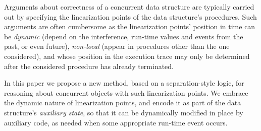 



Arguments about correctness of a concurrent data structure are
typically carried out by specifying the linearization points of the
data structure's procedures.
%
Such arguments are often cumbersome as the linearization points'
position in time can be \emph{dynamic} (depend on the interference,
run-time values and events from the past, or even future),
\emph{non-local} (appear in procedures other than the one considered),
and whose position in the execution trace may only be determined after
the considered procedure has already terminated.

In this paper we propose a new method, based on a separation-style
logic, for reasoning about concurrent objects with such linearization
points. We embrace the dynamic nature of linearization points, and
encode it as part of the data structure's \emph{auxiliary state}, so
that it can be dynamically modified in place by auxiliary code, as
needed when some appropriate run-time event occurs.

